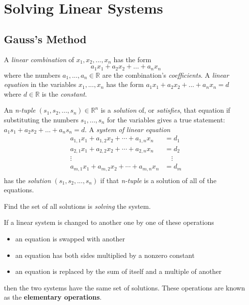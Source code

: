 \section{Solving Linear Systems}

\subsection{Gauss's Method}

\begin{definition}
    A \textit{linear combination} of $x_1, x_2,...,x_n$ has the form
    \[a_1x_1 + a_2x_2 + ... + a_nx_n\]
    where the numbers $a_1,...,a_n \in \mathbb{R}$ are the combination's \textit{coefficients}. A \textit{linear equation} in the variables $x_1,...,x_n$ has the form $a_1x_1 + a_2x_2 + ... + a_nx_n = d$ where $d \in \mathbb{R}$ is the \textit{constant}.

    An \textit{n-tuple} $(s_1,s_2,...,s_n) \in \mathbb{R}^n $ is a \textit{solution} of, or \textit{satisfies}, that equation if substituting the numbers $s_1,...,s_n$ for the variables gives a true statement: $a_1s_1 + a_2s_2 +...+a_ns_n = d$. A \textit{system of linear equation}
    \[
        \begin{aligned}
            a_{1,1}x_1 + a_{1,2}x_2 + \cdots + a_{1,n}x_n & = d_1        \\
            a_{2,1}x_1 + a_{2,2}x_2 + \cdots + a_{2,n}x_n & = d_2        \\
            \vdots    \qquad  \qquad \qquad \qquad        & \quad \vdots \\
            a_{m,1}x_1 + a_{m,2}x_2 + \cdots + a_{m,n}x_n & = d_m        \\
        \end{aligned}
    \]
    has the \textit{solution} $(s_1,s_2,...,s_n)$ if that \textit{n-tuple} is a solution of all of the equations.
\end{definition}

Find the set of all solutions is \textit{solving} the system.

\begin{definition}
    If a linear system is changed to another one by one of these operations
    \begin{itemize}
        \item an equation is swapped with another
        \item an equation has both sides multiplied by a nonzero constant
        \item an equation is replaced by the sum of itself and a multiple of another
    \end{itemize}
    then the two systems have the same set of solutions.
    These operations are known as the \textbf{elementary operations}.
\end{definition}

